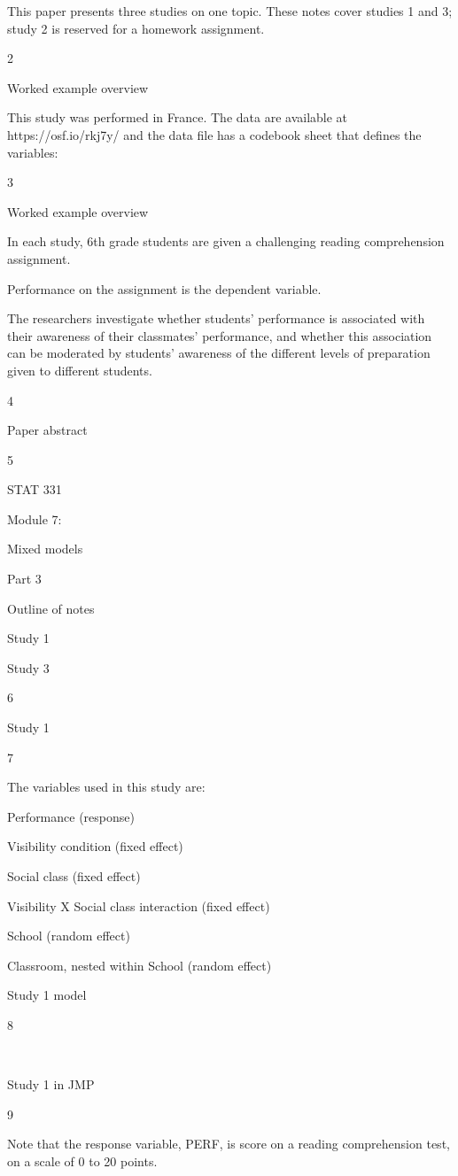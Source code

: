 \documentclass[
  letterpaper,
  DIV=11,
  numbers=noendperiod]{scrreprt}
\begin{document}
This paper presents three studies on one topic. These notes cover
studies 1 and 3; study 2 is reserved for a homework assignment.

2

Worked example overview

This study was performed in France. The data are available at
https://osf.io/rkj7y/ and the data file has a codebook sheet that
defines the variables:

3

Worked example overview

In each study, 6th grade students are given a challenging reading
comprehension assignment.

Performance on the assignment is the dependent variable.

The researchers investigate whether students' performance is associated
with their awareness of their classmates' performance, and whether this
association can be moderated by students' awareness of the different
levels of preparation given to different students.

4

Paper abstract

5

STAT 331

Module 7:

Mixed models

Part 3

Outline of notes

Study 1

Study 3

6

Study 1

7

The variables used in this study are:

Performance (response)

Visibility condition (fixed effect)

Social class (fixed effect)

Visibility X Social class interaction (fixed effect)

School (random effect)

Classroom, nested within School (random effect)

Study 1 model

8

~

Study 1 in JMP

9

Note that the response variable, PERF, is score on a reading
comprehension test, on a scale of 0 to 20 points.
\end{document}
